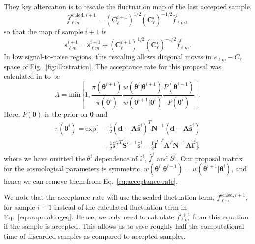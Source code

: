 \documentclass[twocolumn]{../common/aa}
\begin{document}
They key altercation is to rescale the fluctuation map of the last accepted sample,
\begin{equation}
    \hat{f}_{\ell m}^{\textrm{scaled},\, i+1} = \left(\boldsymbol{C}^{i+1}_{\ell}\right)^{1/2}\left(\boldsymbol{C}^{i}_{\ell}\right)^{-1/2} \hat{f}_{\ell m}^{i},
\end{equation}
so that the map of sample $i+1$ is
\begin{equation}
    s_{\ell m}^{i+1} = \hat{s}_{\ell m}^{i+1} + \left(\boldsymbol{C}^{i+1}_{\ell}\right)^{1/2}\left(\boldsymbol{C}^{i}_{\ell}\right)^{-1/2} \hat{f}_{\ell m}^{i}.
\end{equation}
In low signal-to-noise regions, this rescaling allows diagonal moves in $s_{\ell m} - C_\ell$ space of Fig.~\ref{fig:illustration}. The acceptance rate for this proposal was calculated in \cite{racine:2016} to be
\begin{equation}
    \label{eq:acceptance-rate}
    A = \mathrm{min}\left[1, \frac{\pi(\boldsymbol{\theta}^{i+1})}{\pi(\boldsymbol{\theta}^i)} \frac{w(\boldsymbol{\theta}^{i} |\boldsymbol{\theta}^{i+1})}{w(\boldsymbol{\theta}^{i+1} |\boldsymbol{\theta}^i) }\frac{P(\boldsymbol{\theta}^{i+1})}{P(\boldsymbol{\theta}^i)} \right].
\end{equation}
Here, $P(\boldsymbol{\theta})$ is the prior on $\boldsymbol{\theta}$ and
\begin{align}
    \nonumber
    \pi(\boldsymbol{\theta}^{i}) = \mathrm{exp}\bigg[&-\frac12 \left(\boldsymbol{d}-\boldsymbol{A}\boldsymbol{\hat{s}}^i\right)^T \boldsymbol{N}^{-1}\left(\boldsymbol{d}-\boldsymbol{A}\boldsymbol{\hat{s}}^i\right)\\
    &-\frac12\boldsymbol{\hat{s}}^{i,T} \boldsymbol{S}^{i, -1}\boldsymbol{\hat{s}}^i -\frac12 \boldsymbol{\hat{f}}^{i, T}\boldsymbol{A}^T\boldsymbol{N}^{-1} \boldsymbol{A}\boldsymbol{\hat{f}}^i\bigg],
\end{align}
where we have omitted the $\theta^i$ dependence of $\hat{s}^i$, $\hat{f}^i$ and $S^i$. Our proposal matrix for the cosmological parameters is symmetric, $w(\boldsymbol{\theta}^{i} |\boldsymbol{\theta}^{i+1}) = w(\boldsymbol{\theta}^{i+1} |\boldsymbol{\theta}^{i})$, and hence we can remove them from Eq.~\eqref{eq:acceptance-rate}.

We note that the acceptance rate will use the scaled fluctuation term, $f_{\ell m}^{\textrm{scaled}, i+1}$, for sample $i+1$ instead of the calculated fluctuation term in Eq.~\eqref{eq:mapmakingeq}. Hence, we only need to calculate $f_{\ell m}^{i+1}$ from this equation if the sample is accepted. This allows us to save roughly half the computational time of discarded samples as compared to accepted samples.
\end{document}
